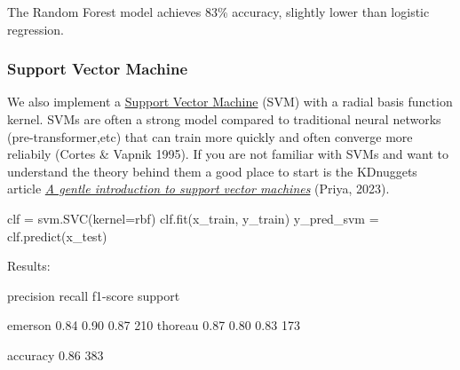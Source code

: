 \documentclass[
]{article}
\newenvironment{Shaded}{}{}
\newcommand{\NormalTok}[1]{#1}
\newcommand{\OperatorTok}[1]{\textcolor[rgb]{0.40,0.40,0.40}{#1}}
\newcommand{\StringTok}[1]{\textcolor[rgb]{0.25,0.44,0.63}{#1}}
\begin{document}
The Random Forest model achieves 83\% accuracy, slightly lower than
logistic regression.

\subsubsection{Support Vector Machine}\label{support-vector-machine}

We also implement a
\href{https://en.wikipedia.org/wiki/Support_vector_machine}{Support
Vector Machine} (SVM) with a radial basis function kernel.
SVM\textquotesingle s are often a strong model compared to traditional
neural networks (pre-transformer,etc) that can train more quickly and
often converge more reliabily (Cortes \& Vapnik 1995). If you are not
familiar with SVMs and want to understand the theory behind them a good
place to start is the KDnuggets article
\href{https://www.kdnuggets.com/2023/07/gentle-introduction-support-vector-machines.html}{\emph{A
gentle introduction to support vector machines}} (Priya, 2023).

\begin{Shaded}
\begin{Highlighting}[]
\NormalTok{clf }\OperatorTok{=}\NormalTok{ svm.SVC(kernel}\OperatorTok{=}\StringTok{\textquotesingle{}rbf\textquotesingle{}}\NormalTok{)}
\NormalTok{clf.fit(x\_train, y\_train)}
\NormalTok{y\_pred\_svm }\OperatorTok{=}\NormalTok{ clf.predict(x\_test)}
\end{Highlighting}
\end{Shaded}

Results:

\begin{Shaded}
\begin{Highlighting}[]
\NormalTok{precision    recall  f1{-}score   support}

\NormalTok{emerson       0.84      0.90      0.87       210}
\NormalTok{thoreau       0.87      0.80      0.83       173}

\NormalTok{accuracy                          0.86       383}
\end{Highlighting}
\end{Shaded}
\end{document}
